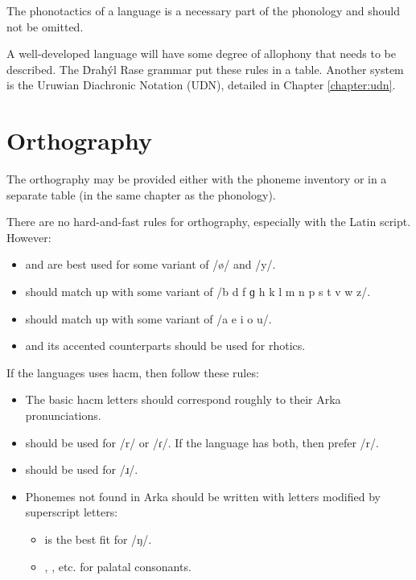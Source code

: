 \documentclass{book}
\begin{document}
The phonotactics of a language is a necessary part of the phonology and should not be omitted.

A well-developed language will have some degree of allophony that needs to be described. The Ḋraħýl Rase grammar put these rules in a table. Another system is the Uruwian Diachronic Notation (UDN), detailed in Chapter \ref{chapter:udn}.

\section{Orthography}

The orthography may be provided either with the phoneme inventory or in a separate table (in the same chapter as the phonology).

There are no hard-and-fast rules for orthography, especially with the Latin script. However:

\begin{itemize}
  \item {} and  are best used for some variant of /ø/ and /y/.
  \item {} should match up with some variant of /b d f ɡ h k l m n p s t v w z/.
  \item {} should match up with some variant of /a e i o u/.
  \item {} and its accented counterparts should be used for rhotics.
\end{itemize}

If the languages uses hacm, then follow these rules:

\begin{itemize}
  \item The basic hacm letters should correspond roughly to their Arka pronunciations.
  \item {} should be used for /r/ or /ɾ/. If the language has both, then prefer /r/.
  \item {} should be used for /ɹ/.
  \item Phonemes not found in Arka should be written with letters modified by superscript letters:
  \begin{itemize}
    \item {} is the best fit for /ŋ/.
    \item {}, , etc. for palatal consonants.
  \end{itemize}
\end{itemize}
\end{document}
